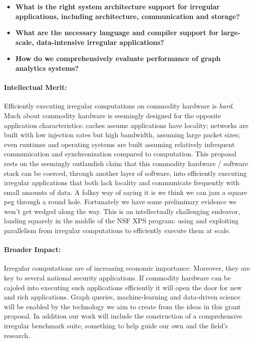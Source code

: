 \begin{itemize}
\item \textbf{What is the right system architecture support for irregular applications, including architecture, communication and storage?}
\item \textbf{What are the necessary language and compiler support for large-scale, data-intensive irregular applications?}
\item \textbf{How do we comprehensively evaluate performance of graph analytics systems?}
\end{itemize}

\paragraph{Intellectual Merit:}

Efficiently executing irregular computations on commodity hardware is \emph{hard}.  Much about commodity hardware is seemingly designed for the opposite application characteristics: caches assume applications have locality; networks are built with low injection rates but high bandwidth, assuming large packet sizes; even runtimes and operating systems are built assuming relatively infrequent communication and synchronization compared to computation.  This proposal rests on the seemingly outlandish claim that this commodity hardware / software stack can be coerced, through another layer of software, into efficiently executing irregular applications that both lack locality and communicate frequently with small amounts of data.  A folksy way of saying it is we think we can jam a square peg through a round hole.  Fortunately we have some preliminary evidence we won't get wedged along the way.  This is an intellectually challenging endeavor, landing squarely in the middle of the NSF XPS program: using and exploiting parallelism from irregular computations to efficiently execute them at scale.

\paragraph{Broader Impact:}

Irregular computations are of increasing economic importance.  Moreover, they are key to several national security applications.  If commodity hardware can be cajoled into executing such applications efficiently it will open the door for new and rich applications.  Graph queries, machine-learning and data-driven science will be enabled by the technology we aim to create from the ideas in this grant proposal.  In addition our work will include the construction of a comprehensive irregular benchmark suite, something to help guide our own and the field's research.


